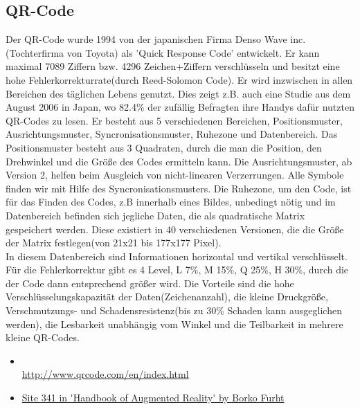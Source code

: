 \subsection*{QR-Code}
Der QR-Code wurde 1994 von der japanischen Firma Denso Wave inc.(Tochterfirma von Toyota) als 'Quick Response Code' entwickelt. Er kann maximal 7089 Ziffern bzw. 4296 Zeichen+Ziffern verschlüsseln und besitzt eine hohe Fehlerkorrekturrate(durch Reed-Solomon Code). Er wird inzwischen in allen Bereichen des täglichen Lebens genutzt. Dies zeigt z.B. auch eine Studie aus dem August 2006 in Japan, wo 82.4\% der zufällig Befragten ihre Handys dafür nutzten QR-Codes zu lesen.\cite{Furht2011}
Er besteht aus 5 verschiedenen Bereichen, Positionsmuster, Ausrichtungsmuster, Syncronisationsmuster, Ruhezone und Datenbereich. Das Positionsmuster besteht aus 3 Quadraten, durch die man die Position, den Drehwinkel und die Größe des Codes ermitteln kann. Die Ausrichtungsmuster, ab Version 2, helfen beim Ausgleich von nicht-linearen Verzerrungen. Alle Symbole finden wir mit Hilfe des Syncronisationsmusters. Die Ruhezone, um den Code, ist für das Finden des Codes, z.B innerhalb eines Bildes, unbedingt nötig und im Datenbereich befinden sich jegliche Daten, die als quadratische Matrix gespeichert werden. Diese existiert in 40 verschiedenen Versionen, die die Größe der Matrix festlegen(von 21x21 bis 177x177 Pixel).\\
In diesem Datenbereich sind Informationen horizontal und vertikal verschlüsselt.
Für die Fehlerkorrektur gibt es 4 Level, L 7\%, M 15\%, Q 25\%, H 30\%, durch die der Code dann entsprechend größer wird.
Die Vorteile sind die hohe Verschlüsselungskapazität der Daten(Zeichenanzahl), die kleine Druckgröße, Verschmutzungs- und Schadensresistenz(bis zu 30\% Schaden kann ausgeglichen werden), die Lesbarkeit unabhängig vom Winkel und die Teilbarkeit in mehrere kleine QR-Codes.
\begin{itemize}
	\item \cite{DensoWave2000-2010}\\
	\url{http://www.qrcode.com/en/index.html}
	\item \url{Site 341 in 'Handbook of Augmented Reality' by Borko Furht}
\end{itemize}